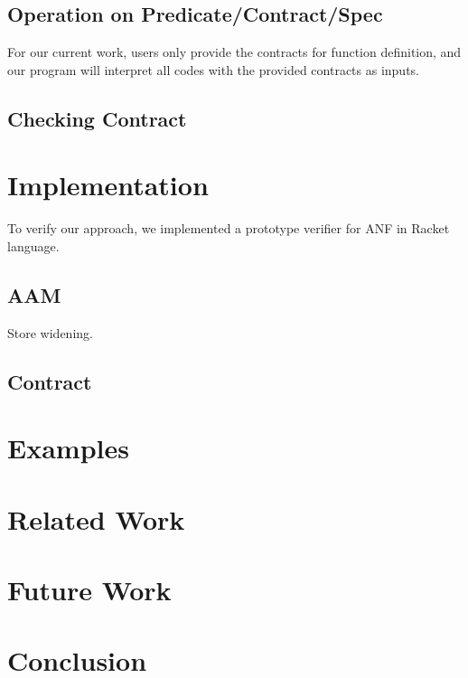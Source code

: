 \documentclass[paper=a4, fontsize=11pt]{scrartcl} %
\numberwithin{equation}{section} %
\numberwithin{figure}{section} %
\numberwithin{table}{section} %
\begin{document}
\subsection{Operation on Predicate/Contract/Spec}
For our current work, users only provide the contracts for function definition, and our program will interpret all codes with the provided contracts as inputs.




\subsection{Checking Contract}


\section{Implementation}

To verify our approach, we implemented a prototype verifier for ANF in Racket language.

\subsection{AAM}
Store widening.

\subsection{Contract}


\section{Examples}


\section{Related Work}


\section{Future Work}

\section{Conclusion}
\end{document}
